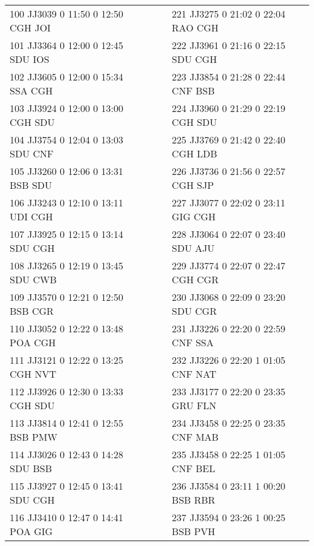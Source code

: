 \begin{scriptsize}
\begin{longtable}{l c c l}
100 JJ3039 0 11:50 0 12:50 CGH JOI & & & 221 JJ3275 0 21:02 0 22:04 RAO CGH \\

101 JJ3364 0 12:00 0 12:45 SDU IOS & & & 222 JJ3961 0 21:16 0 22:15 SDU CGH \\

102 JJ3605 0 12:00 0 15:34 SSA CGH & & & 223 JJ3854 0 21:28 0 22:44 CNF BSB \\

103 JJ3924 0 12:00 0 13:00 CGH SDU & & & 224 JJ3960 0 21:29 0 22:19 CGH SDU \\

104 JJ3754 0 12:04 0 13:03 SDU CNF & & & 225 JJ3769 0 21:42 0 22:40 CGH LDB \\

105 JJ3260 0 12:06 0 13:31 BSB SDU & & & 226 JJ3736 0 21:56 0 22:57 CGH SJP \\

106 JJ3243 0 12:10 0 13:11 UDI CGH & & & 227 JJ3077 0 22:02 0 23:11 GIG CGH \\

107 JJ3925 0 12:15 0 13:14 SDU CGH & & & 228 JJ3064 0 22:07 0 23:40 SDU AJU \\

108 JJ3265 0 12:19 0 13:45 SDU CWB & & & 229 JJ3774 0 22:07 0 22:47 CGH CGR \\

109 JJ3570 0 12:21 0 12:50 BSB CGR & & & 230 JJ3068 0 22:09 0 23:20 SDU CGR \\

110 JJ3052 0 12:22 0 13:48 POA CGH & & & 231 JJ3226 0 22:20 0 22:59 CNF SSA \\

111 JJ3121 0 12:22 0 13:25 CGH NVT & & & 232 JJ3226 0 22:20 1 01:05 CNF NAT \\

112 JJ3926 0 12:30 0 13:33 CGH SDU & & & 233 JJ3177 0 22:20 0 23:35 GRU FLN \\

113 JJ3814 0 12:41 0 12:55 BSB PMW & & & 234 JJ3458 0 22:25 0 23:35 CNF MAB \\

114 JJ3026 0 12:43 0 14:28 SDU BSB & & & 235 JJ3458 0 22:25 1 01:05 CNF BEL \\

115 JJ3927 0 12:45 0 13:41 SDU CGH & & & 236 JJ3584 0 23:11 1 00:20 BSB RBR \\

116 JJ3410 0 12:47 0 14:41 POA GIG & & & 237 JJ3594 0 23:26 1 00:25 BSB PVH \\


\end{longtable}
\end{scriptsize}
